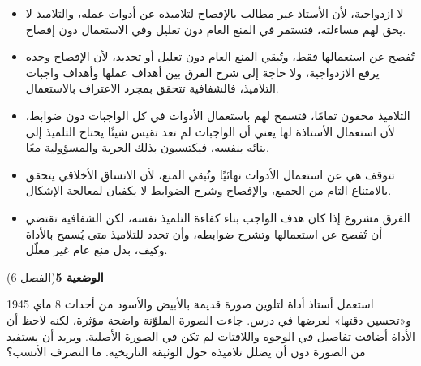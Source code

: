 \documentclass[11pt,a4paper]{article}
\begin{document}
\begin{itemize}[leftmargin=1.0cm, labelsep=6pt, itemsep=3pt, topsep=4pt, parsep=0pt]
  \item[\textbf{أ)}] لا ازدواجية، لأن الأستاذ غير مطالب بالإفصاح لتلاميذه عن أدوات عمله، والتلاميذ لا يحق لهم مساءلته، فتستمر في المنع العام دون تعليل وفي الاستعمال دون إفصاح.
  \item[\textbf{ب)}] تُفصح عن استعمالها فقط، وتُبقي المنع العام دون تعليل أو تحديد، لأن الإفصاح وحده يرفع الازدواجية، ولا حاجة إلى شرح الفرق بين أهداف عملها وأهداف واجبات التلاميذ، فالشفافية تتحقق بمجرد الاعتراف بالاستعمال.
  \item[\textbf{ج)}] التلاميذ محقون تمامًا، فتسمح لهم باستعمال الأدوات في كل الواجبات دون ضوابط، لأن استعمال الأستاذة لها يعني أن الواجبات لم تعد تقيس شيئًا يحتاج التلميذ إلى بنائه بنفسه، فيكتسبون بذلك الحرية والمسؤولية معًا.
  \item[\textbf{د)}] تتوقف هي عن استعمال الأدوات نهائيًا وتُبقي المنع، لأن الاتساق الأخلاقي يتحقق بالامتناع التام من الجميع، والإفصاح وشرح الضوابط لا يكفيان لمعالجة الإشكال.
  \item[\textbf{هـ)}] الفرق مشروع إذا كان هدف الواجب بناء كفاءة التلميذ نفسه، لكن الشفافية تقتضي أن تُفصح عن استعمالها وتشرح ضوابطه، وأن تحدد للتلاميذ متى يُسمح بالأداة وكيف، بدل منع عام غير معلّل.
\end{itemize}
\par\vspace{6pt}
\noindent
{\large\khatt\textbf{الوضعية 5}}\hfill{\small(الفصل 6)}\par\nopagebreak\vspace{3pt}
\setlength{\fboxsep}{7pt}\colorbox{gray!10}{\parbox{\dimexpr\linewidth-14pt}{استعمل أستاذ أداة لتلوين صورة قديمة بالأبيض والأسود من أحداث 8 ماي 1945 و«تحسين دقتها» لعرضها في درس. جاءت الصورة الملوّنة واضحة مؤثرة، لكنه لاحظ أن الأداة أضافت تفاصيل في الوجوه واللافتات لم تكن في الصورة الأصلية. ويريد أن يستفيد من الصورة دون أن يضلل تلاميذه حول الوثيقة التاريخية. ما التصرف الأنسب؟}}\par\nopagebreak
\end{document}
